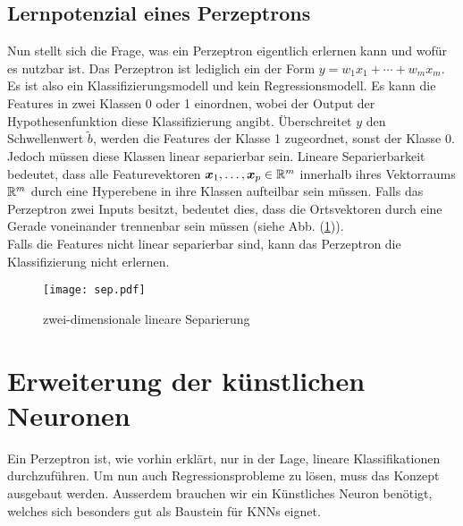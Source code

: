 \subsection{Lernpotenzial eines Perzeptrons}
Nun stellt sich die Frage, was ein Perzeptron eigentlich erlernen kann und wofür
es nutzbar ist.
Das Perzeptron ist lediglich ein  der Form
$y = w_1x_1 + \cdots + w_m x_m$. Es ist also ein Klassifizierungsmodell und kein Regressionsmodell.
Es kann die Features in zwei Klassen 0 oder 1 einordnen, wobei der Output der
Hypothesenfunktion diese Klassifizierung angibt.
Überschreitet $y$ den Schwellenwert $\tilde{b}$, werden die Features der Klasse 1 zugeordnet, sonst
der Klasse 0.
Jedoch müssen diese Klassen linear separierbar sein.
\para{}
Lineare Separierbarkeit bedeutet, dass alle Featurevektoren $\bm{x}_1,\ldots,\bm{x}_p \in \mathbb{R}^m$
innerhalb ihres Vektorraums $\mathbb{R}^m$ durch eine Hyperebene in ihre Klassen aufteilbar sein müssen.
Falls das Perzeptron zwei Inputs besitzt, bedeutet dies, dass die Ortsvektoren
durch eine Gerade voneinander trennenbar sein müssen (siehe Abb.
(\ref{fig:linearer_Klassifikator})). \\
Falls die Features nicht linear separierbar sind,
kann das Perzeptron die Klassifizierung nicht erlernen.
\\
\begin{figure}[h!]
  \centering
  \texttt{[image: sep.pdf]}
  \caption{zwei-dimensionale lineare Separierung}
  \label{fig:linearer_Klassifikator}
\end{figure}
\para{}
\cite{wiki:perzeptron}
\cite{wiki:linear_separability}

\section{Erweiterung der künstlichen Neuronen}\label{sec:künstlicheNeuronen}
Ein Perzeptron ist, wie vorhin erklärt, nur in der Lage, lineare Klassifikationen
durchzuführen. Um nun auch Regressionsprobleme zu lösen, muss das Konzept
ausgebaut werden. Ausserdem brauchen wir ein Künstliches Neuron benötigt, welches sich
besonders gut als Baustein für KNNs eignet.


